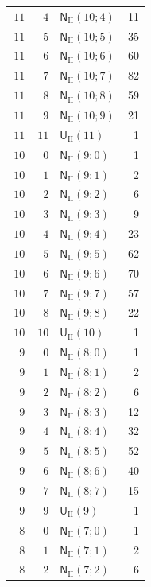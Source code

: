 \documentclass[10pt]{article}
\begin{document}
\begin{longtable}{@{}r r >{\RaggedRight\arraybackslash}p{0.48\linewidth} r@{}}
$11$ & $4$ & $\mathsf N_{\mathrm{II}}(10;4)$ & 11 \\
$11$ & $5$ & $\mathsf N_{\mathrm{II}}(10;5)$ & 35 \\
$11$ & $6$ & $\mathsf N_{\mathrm{II}}(10;6)$ & 60 \\
$11$ & $7$ & $\mathsf N_{\mathrm{II}}(10;7)$ & 82 \\
$11$ & $8$ & $\mathsf N_{\mathrm{II}}(10;8)$ & 59 \\
$11$ & $9$ & $\mathsf N_{\mathrm{II}}(10;9)$ & 21 \\
$11$ & $11$ & $\mathsf U_{\mathrm{II}}(11)$ & 1 \\
$10$ & $0$ & $\mathsf N_{\mathrm{II}}(9;0)$ & 1 \\
$10$ & $1$ & $\mathsf N_{\mathrm{II}}(9;1)$ & 2 \\
$10$ & $2$ & $\mathsf N_{\mathrm{II}}(9;2)$ & 6 \\
$10$ & $3$ & $\mathsf N_{\mathrm{II}}(9;3)$ & 9 \\
$10$ & $4$ & $\mathsf N_{\mathrm{II}}(9;4)$ & 23 \\
$10$ & $5$ & $\mathsf N_{\mathrm{II}}(9;5)$ & 62 \\
$10$ & $6$ & $\mathsf N_{\mathrm{II}}(9;6)$ & 70 \\
$10$ & $7$ & $\mathsf N_{\mathrm{II}}(9;7)$ & 57 \\
$10$ & $8$ & $\mathsf N_{\mathrm{II}}(9;8)$ & 22 \\
$10$ & $10$ & $\mathsf U_{\mathrm{II}}(10)$ & 1 \\
$9$ & $0$ & $\mathsf N_{\mathrm{II}}(8;0)$ & 1 \\
$9$ & $1$ & $\mathsf N_{\mathrm{II}}(8;1)$ & 2 \\
$9$ & $2$ & $\mathsf N_{\mathrm{II}}(8;2)$ & 6 \\
$9$ & $3$ & $\mathsf N_{\mathrm{II}}(8;3)$ & 12 \\
$9$ & $4$ & $\mathsf N_{\mathrm{II}}(8;4)$ & 32 \\
$9$ & $5$ & $\mathsf N_{\mathrm{II}}(8;5)$ & 52 \\
$9$ & $6$ & $\mathsf N_{\mathrm{II}}(8;6)$ & 40 \\
$9$ & $7$ & $\mathsf N_{\mathrm{II}}(8;7)$ & 15 \\
$9$ & $9$ & $\mathsf U_{\mathrm{II}}(9)$ & 1 \\
$8$ & $0$ & $\mathsf N_{\mathrm{II}}(7;0)$ & 1 \\
$8$ & $1$ & $\mathsf N_{\mathrm{II}}(7;1)$ & 2 \\
$8$ & $2$ & $\mathsf N_{\mathrm{II}}(7;2)$ & 6 \\

\end{longtable}
\end{document}
